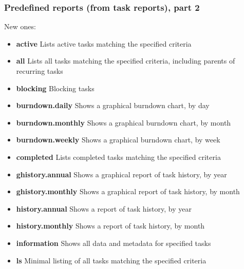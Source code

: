 \documentclass[t,handout]{beamer}
\begin{document}
\begin{frame}[fragile]\frametitle{Predefined reports (from task reports), part 2}
    New ones:

    \begin{itemize}
        \item \textbf{active}           Lists active tasks matching the specified criteria
        \item \textbf{all}              Lists all tasks matching the specified criteria, including parents of recurring tasks
        \item \textbf{blocking}         Blocking tasks
        \item \textbf{burndown.daily}   Shows a graphical burndown chart, by day
        \item \textbf{burndown.monthly} Shows a graphical burndown chart, by month
        \item \textbf{burndown.weekly}  Shows a graphical burndown chart, by week
        \item \textbf{completed}        Lists completed tasks matching the specified criteria
        \item \textbf{ghistory.annual}  Shows a graphical report of task history, by year
        \item \textbf{ghistory.monthly} Shows a graphical report of task history, by month
        \item \textbf{history.annual}   Shows a report of task history, by year
        \item \textbf{history.monthly}  Shows a report of task history, by month
        \item \textbf{information}      Shows all data and metadata for specified tasks
        \item \textbf{ls}               Minimal listing of all tasks matching the specified criteria
    \end{itemize}
\end{frame}
\end{document}
